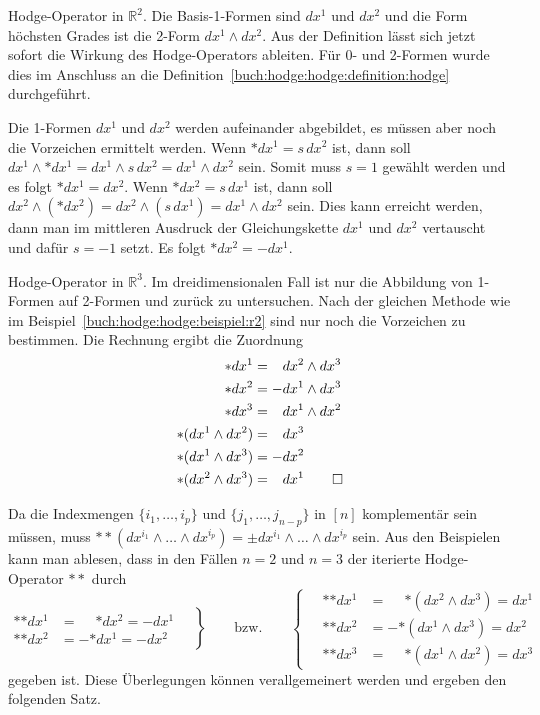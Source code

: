 \begin{beispiel}
\label{buch:hodge:hodge:beispiel:r2}
Hodge-Operator in $\mathbb{R}^2$.
Die Basis-1-Formen sind $dx^1$ und $dx^2$ und die Form höchsten Grades ist
die 2-Form $dx^1\wedge dx^2$.
Aus der Definition lässt sich jetzt sofort die Wirkung des Hodge-Operators
ableiten.
Für 0- und 2-Formen wurde dies im Anschluss an die
Definition~\ref{buch:hodge:hodge:definition:hodge} durchgeführt.

Die 1-Formen $dx^1$ und $dx^2$ werden aufeinander abgebildet, es müssen
aber noch die Vorzeichen ermittelt werden.
Wenn $\ast dx^1=s\,dx^2$ ist, dann soll
$dx^1\wedge \ast dx^1=dx^1\wedge s\,dx^2=dx^1\wedge dx^2$ sein.
Somit muss $s=1$ gewählt werden und es folgt $\ast dx^1=dx^2$.
Wenn $\ast dx^2=s\,dx^1$ ist, dann soll
$dx^2\wedge(\ast dx^2)=dx^2\wedge(s\,dx^1)=dx^1\wedge dx^2$ sein.
Dies kann erreicht werden, dann man im mittleren Ausdruck der
Gleichungskette $dx^1$ und $dx^2$ vertauscht und dafür $s=-1$ setzt.
Es folgt $\ast dx^2=-dx^1$.
\end{beispiel}

\begin{beispiel}
\label{buch:hodge:hodge:beispiel:r3}
Hodge-Operator in $\mathbb{R}^3$.
Im dreidimensionalen Fall ist nur die Abbildung von 1-Formen auf
2-Formen und zurück zu untersuchen.
Nach der gleichen Methode wie im
Beispiel~\ref{buch:hodge:hodge:beispiel:r2}
sind nur noch die Vorzeichen zu bestimmen.
Die Rechnung ergibt die Zuordnung
\begin{align*}
\ast dx^1 &= \phantom{-}dx^2\wedge dx^3 \\
\ast dx^2 &=          - dx^1\wedge dx^3 \\
\ast dx^3 &= \phantom{-}dx^1\wedge dx^2 \\
\ast(dx^1\wedge dx^2) &= \phantom{-}dx^3 \\
\ast(dx^1\wedge dx^3) &=          - dx^2 \\
\ast(dx^2\wedge dx^3) &= \phantom{-}dx^1
\qedhere
\end{align*}
\end{beispiel}

Da die Indexmengen $\{i_1,\dots,i_p\}$ und
$\{j_1,\dots,j_{n-p}\}$ in $[n]$ komplementär sein müssen,
muss
\(
\ast{\ast}(dx^{i_1}\wedge\dots\wedge dx^{i_p})
=
\pm dx^{i_1}\wedge\dots\wedge dx^{i_p}
\)
sein.
Aus den Beispielen kann man ablesen, dass in den Fällen $n=2$ und $n=3$
der iterierte Hodge-Operator  $\ast\ast$ durch
\[
\left.
\begin{aligned}
\ast{\ast dx^1} &= \phantom{-}{\ast dx^2} = -dx^1\\
\ast{\ast dx^2} &=          - {\ast dx^1} = -dx^2
\end{aligned}
\quad
\right\}
\qquad
\text{bzw.}
\qquad
\left\{
\quad
\begin{aligned}
\ast{\ast dx^1} &= \phantom{-}{\ast(dx^2\wedge dx^3)} = dx^1 \\
\ast{\ast dx^2} &=          - {\ast(dx^1\wedge dx^3)} = dx^2 \\
\ast{\ast dx^3} &= \phantom{-}{\ast(dx^1\wedge dx^2)} = dx^3 
\end{aligned}
\right.
\]
gegeben ist.
Diese Überlegungen können verallgemeinert werden und ergeben den
folgenden Satz.

